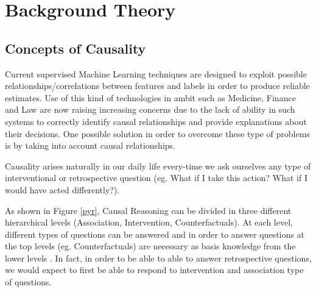 \chapter{Background Theory}

  
\newenvironment{conditions}[1][where:]
  {#1 \begin{tabular}[t]{>{$}l<{$} @{${}={}$} l}}
  {\end{tabular}\\[\belowdisplayskip]}

\label{ch:background}

\section{Concepts of Causality}
\label{concepts}

Current supervised Machine Learning techniques are designed to exploit possible relationships/correlations between features and labels in order to produce reliable estimates. Use of this kind of technologies in ambit such as Medicine, Finance and Law are now raising increasing concerns due to the lack of ability in such systems to correctly identify causal relationships and provide explanations about their decisions. One possible solution in order to overcome these type of problems is by taking into account causal relationships.

Causality arises naturally in our daily life every-time we ask ourselves any type of interventional or retrospective question (eg. What if I take this action? What if I would have acted differently?).

As shown in Figure \ref{pyr}, Causal Reasoning can be divided in three different hierarchical levels (Association, Intervention, Counterfactuals). At each level, different types of questions can be answered and in order to answer questions at the top levels (eg. Counterfactuals) are necessary as basis knowledge from the lower levels \cite{tools}. In fact, in order to be able to able to answer retrospective questions, we would expect to first be able to respond to intervention and association type of questions.

